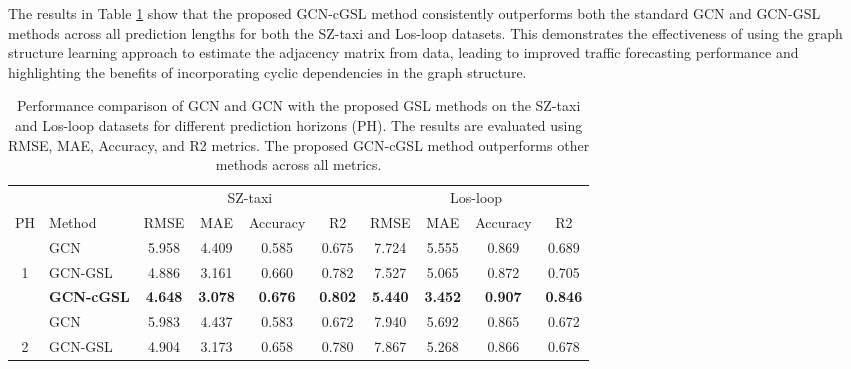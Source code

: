 \documentclass[pdflatex,sn-mathphys-num]{sn-jnl}%
\theoremstyle{thmstyleone}%
\theoremstyle{thmstyletwo}%
\theoremstyle{thmstylethree}%
\begin{document}

The results in Table \ref{tab:gcn_gsl_comparison_combined} show that the proposed GCN-cGSL method consistently outperforms both the standard GCN and GCN-GSL methods across all prediction lengths for both the SZ-taxi and Los-loop datasets. This demonstrates the effectiveness of using the graph structure learning approach to estimate the adjacency matrix from data, leading to improved traffic forecasting performance and highlighting the benefits of incorporating cyclic dependencies in the graph structure.


\begin{table}[!t]
  \centering
  \caption{Performance comparison of GCN and GCN with the proposed GSL methods on the SZ-taxi and Los-loop datasets for different prediction horizons (PH). The results are evaluated using RMSE, MAE, Accuracy, and R2 metrics. The proposed GCN-cGSL method outperforms other methods across all metrics.}
  \label{tab:gcn_gsl_comparison_combined}
  \begin{tabular}{cl|cccc|cccc}
    \toprule
         &          & \multicolumn{4}{c}{SZ-taxi} & \multicolumn{4}{c}{Los-loop} \\
     PH       &     Method             &            RMSE &             MAE &        Accuracy &              R2 &            RMSE &             MAE &        Accuracy &              R2 \\
    \midrule
                     &             GCN &          5.958 &          4.409 &          0.585 &          0.675 &          7.724 &          5.555 &          0.869 &          0.689 \\
                    1 &  GCN-GSL &          4.886 &          3.161 &          0.660 &          0.782 &          7.527 &          5.065 &          0.872 &          0.705 \\
                     & \textbf{GCN-cGSL} & \textbf{4.648} & \textbf{3.078} & \textbf{0.676} & \textbf{0.802} & \textbf{5.440} & \textbf{3.452} & \textbf{0.907} & \textbf{0.846} \\
                    \hdashline
                     &             GCN &          5.983 &          4.437 &          0.583 &          0.672 &          7.940 &          5.692 &          0.865 &          0.672 \\
                    2 &  GCN-GSL &          4.904 &          3.173 &          0.658 &          0.780 &          7.867 &          5.268 &          0.866 &          0.678 \\

\end{tabular}
\end{table}
\end{document}
